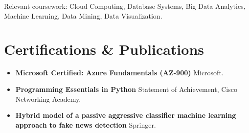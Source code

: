 \documentclass[letterpaper,10pt]{article}
\newenvironment{bullets}
  {\begin{itemize}[leftmargin=1.15em,labelsep=0.45em,itemsep=1.3pt,
                   topsep=2.5pt,parsep=0pt,partopsep=0pt,label=\textbullet]}
  {\end{itemize}\vspace{1pt}}
\begin{document}
Relevant coursework: Cloud Computing, Database Systems, Big Data Analytics,
Machine Learning, Data Mining, Data Visualization.
\vspace{4pt}

\section{Certifications \& Publications}

\begin{bullets}
  \item \textbf{Microsoft Certified: Azure Fundamentals (AZ-900)} \textemdash{}
        Microsoft.
  \item \textbf{Programming Essentials in Python} \textemdash{} Statement of
        Achievement, Cisco Networking Academy.  %
  \item \textbf{Hybrid model of a passive aggressive classifier machine learning
        approach to fake news detection} \textemdash{} Springer.
\end{bullets}
\end{document}
